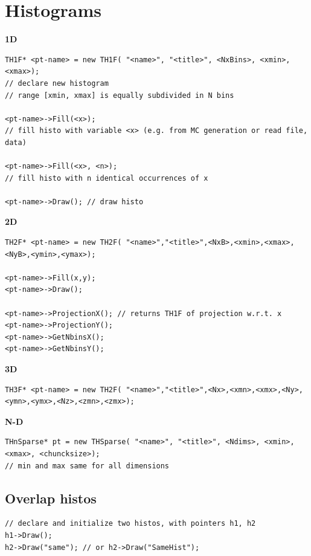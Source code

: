 \documentclass[10pt, oneside]{article}
\begin{document}
\section{Histograms}
\textbf{1D}
\begin{verbatim}
TH1F* <pt-name> = new TH1F( "<name>", "<title>", <NxBins>, <xmin>, <xmax>);
// declare new histogram
// range [xmin, xmax] is equally subdivided in N bins

<pt-name>->Fill(<x>); 
// fill histo with variable <x> (e.g. from MC generation or read file, data)

<pt-name>->Fill(<x>, <n>);
// fill histo with n identical occurrences of x

<pt-name>->Draw(); // draw histo
\end{verbatim}
\textbf{2D}
\begin{verbatim}
TH2F* <pt-name> = new TH2F( "<name>","<title>",<NxB>,<xmin>,<xmax>,<NyB>,<ymin>,<ymax>);

<pt-name>->Fill(x,y);
<pt-name>->Draw();

<pt-name>->ProjectionX(); // returns TH1F of projection w.r.t. x
<pt-name>->ProjectionY();
<pt-name>->GetNbinsX();
<pt-name>->GetNbinsY();
\end{verbatim}
\textbf{3D}
\begin{verbatim}
TH3F* <pt-name> = new TH2F( "<name>","<title>",<Nx>,<xmn>,<xmx>,<Ny>,<ymn>,<ymx>,<Nz>,<zmn>,<zmx>);
\end{verbatim}
\textbf{N-D}
\begin{verbatim}
THnSparse* pt = new THSparse( "<name>", "<title>", <Ndims>, <xmin>, <xmax>, <chuncksize>); 
// min and max same for all dimensions
\end{verbatim}

\subsection{Overlap histos}
\begin{verbatim}
// declare and initialize two histos, with pointers h1, h2
h1->Draw();
h2->Draw("same"); // or h2->Draw("SameHist");
\end{verbatim}
\end{document}
